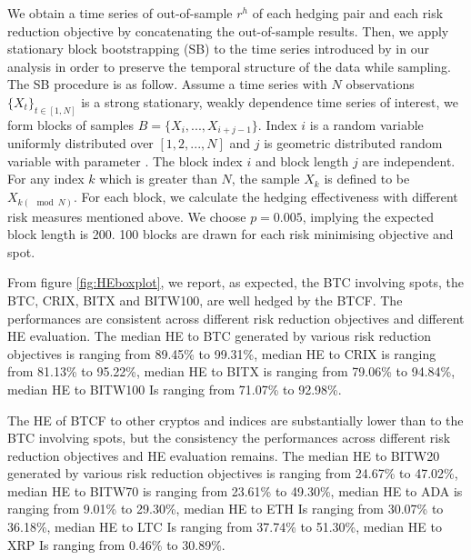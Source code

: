 We obtain a time series of out-of-sample $r^h$ of each hedging pair and each risk reduction objective by concatenating the out-of-sample results.
Then, we apply stationary block bootstrapping (SB) to the time series introduced by \cite{Politis1994} in our analysis in order to preserve the temporal structure of the data while sampling.
The SB procedure is as follow. 
Assume a time series with $N$ observations $\{X_t\}_{t \in [1,N]}$ is a strong stationary, weakly dependence time series of interest,
we form blocks of samples $B = \{X_i, ..., X_{i+j-1}\}$.
Index $i$ is a random variable uniformly distributed over
$[1,2,...,N]$ and $j$ is geometric distributed random variable with
parameter .  
The block index $i$ and block length $j$ are independent.
For any index $k$ which is greater than $N$, the sample $X_k$ is defined to be $X_{k(\mod N)}$.
For each block, we calculate the hedging effectiveness with different risk measures mentioned above.
We choose $p=0.005$, implying the expected block length is 200.
100 blocks are drawn for each risk minimising objective and
spot. 


From figure \ref{fig:HEboxplot}, we report, as expected, the BTC
involving spots, the BTC, CRIX, BITX and BITW100, are well hedged by
the BTCF. \natp{\em [fix.]}
The performances are consistent across different risk reduction objectives and different HE evaluation.
The median HE to BTC generated by various risk reduction objectives is ranging from 89.45\% to 99.31\%, median HE to CRIX is ranging from 81.13\% to 95.22\%,
median HE to BITX is ranging from 79.06\% to 94.84\%, median HE to BITW100 Is ranging from 71.07\% to 92.98\%.  

The HE of BTCF to other cryptos and indices are substantially lower than to the BTC involving spots, but the consistency the performances across different risk reduction objectives and HE evaluation remains.
The median HE to BITW20 generated by various risk reduction objectives is ranging from 24.67\% to 47.02\%, median HE to BITW70 is ranging from 23.61\% to 49.30\%,
median HE to ADA is ranging from 9.01\% to 29.30\%, median HE to ETH Is ranging from 30.07\% to 36.18\%, median HE to LTC Is ranging from 37.74\% to 51.30\%,
median HE to XRP Is ranging from 0.46\% to 30.89\%. 

